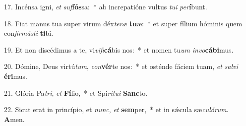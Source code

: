 17. Incénsa igni, \textit{et} \textit{suf}\textbf{fós}sa:~*  ab increpatióne vultus \textit{tu}\textit{i} \textit{per}\textbf{í}bunt.\

18. Fiat manus tua super virum déx\textit{te}\textit{ræ} \textbf{tu}æ:~*  et super fílium hóminis quem con\textit{fir}\textit{más}\textit{ti} \textbf{ti}bi.\

19. Et non discédimus a te, vi\textit{vi}\textit{fi}\textbf{cá}bis nos:~*  et nomen tu\textit{um} \textit{in}\textit{vo}\textbf{cá}\textbf{bi}mus.\

20. Dómine, Deus virtú\textit{tum}, \textit{con}\textbf{vér}te nos:~*  et osténde fáciem tuam, \textit{et} \textit{sal}\textit{vi} \textbf{é}\textbf{ri}mus.\

21. Glória Pa\textit{tri}, \textit{et} \textbf{Fí}lio,~*  et Spi\textit{rí}\textit{tu}\textit{i} \textbf{Sanc}to.\

22. Sicut erat in princípio, et \textit{nunc}, \textit{et} \textbf{sem}per,~*  et in sǽcula sæ\textit{cu}\textit{ló}\textit{rum}. \textbf{A}men.\

